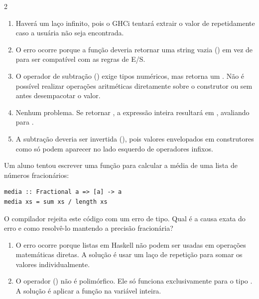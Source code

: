 \documentclass[a4paper,10pt,brazil]{article}
\begin{document}
\begin{multicols}{2}
\begin{enumerate}
  \item Haverá um laço infinito, pois o GHCi tentará extrair o valor de  repetidamente caso a usuária não seja encontrada.

  \item O erro ocorre porque a função  deveria retornar uma string vazia () em vez de  para ser compatível com as regras de E/S.

  \item O operador de subtração (\haskellinline{-}) exige tipos numéricos, mas  retorna um . Não é possível realizar operações aritméticas diretamente sobre o construtor  ou  sem antes desempacotar o valor.

  \item Nenhum problema. Se  retornar , a expressão inteira resultará em , avaliando para .

  \item A subtração deveria ser invertida (), pois valores envelopados em construtores como  só podem aparecer no lado esquerdo de operadores infixos.


\end{enumerate}

Um aluno tentou escrever uma função para calcular a média de uma lista de números fracionários:
\begin{verbatim}
media :: Fractional a => [a] -> a
media xs = sum xs / length xs
\end{verbatim}
O compilador rejeita este código com um erro de tipo. Qual é a causa exata do erro e como resolvê-lo mantendo a precisão fracionária?

\begin{enumerate}
  \item O erro ocorre porque listas em Haskell não podem ser usadas em operações matemáticas diretas. A solução é usar um laço de repetição  para somar os valores individualmente.

  \item O operador (\haskellinline{/}) não é polimórfico. Ele só funciona exclusivamente para o tipo . A solução é aplicar a função  na variável  inteira.


\end{enumerate}
\end{multicols}
\end{document}
